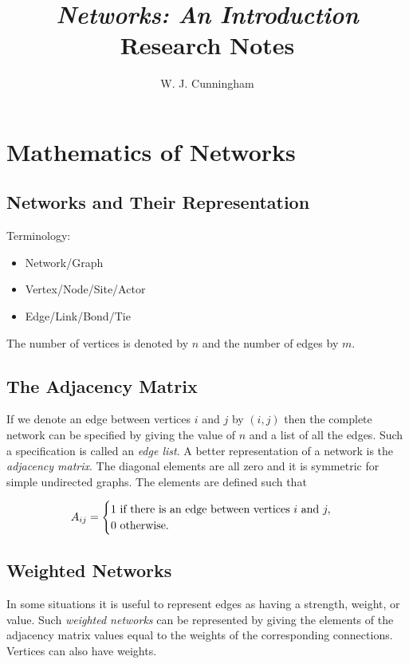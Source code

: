 \documentclass[12pt]{book}
\begin{document}
\title{\textit{Networks:  An Introduction} Research Notes}
\author{W. J. Cunningham}
\maketitle

\setcounter{chapter}{5}
\chapter{Mathematics of Networks}

\section{Networks and Their Representation}
Terminology:
\begin{itemize}
  \item Network/Graph
  \item Vertex/Node/Site/Actor
  \item Edge/Link/Bond/Tie
\end{itemize}
The number of vertices is denoted by $n$ and the number of edges by $m$.

\section{The Adjacency Matrix}
If we denote an edge between vertices $i$ and $j$ by $(i,j)$ then the complete network can be specified by giving the value of $n$ and a list of all the edges.  Such a specification is called an \textit{edge list}.  A better representation of a network is the \textit{adjacency matrix}.  The diagonal elements are all zero and it is symmetric for simple undirected graphs.  The elements are defined such that

\begin{equation}
A_{ij} = 
  \begin{cases}
    1$ if there is an edge between vertices $i$ and $j, \\
    0$ otherwise$.
  \end{cases}
\end{equation}

\section{Weighted Networks}
In some situations it is useful to represent edges as having a strength, weight, or value.  Such \textit{weighted networks} can be represented by giving the elements of the adjacency matrix values equal to the weights of the corresponding connections.  Vertices can also have weights.
\end{document}
